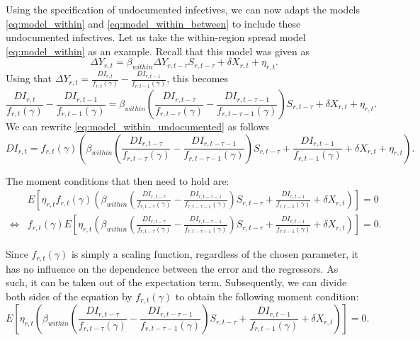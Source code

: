 \documentclass[12pt]{article}
\begin{document}
	Using the specification of undocumented infectives, we can now adapt the models \eqref{eq:model_within} and \eqref{eq:model_within_between}  to include these undocumented infectives. Let us take the within-region spread model \eqref{eq:model_within} as an example. Recall that this model was given as
	    \begin{equation*}
		    \Delta Y_{r,t} = \beta_{within}\Delta Y_{r,t-\tau}S_{r,t-\tau} + \delta X_{r,t} + \eta_{r,t}.
	    \end{equation*}
	Using that $\Delta Y_{r,t} = \frac{DI_{r,t}}{f_{r,t}(\gamma)} - \frac{DI_{r,t-1}}{f_{r,t-1}(\gamma)}$, this becomes
	    \begin{equation} \label{eq:model_within_undocumented}
		    \frac{DI_{r,t}}{f_{r,t}(\gamma)} - \frac{DI_{r,t-1}}{f_{r,t-1}(\gamma)} = \beta_{within}\left(\frac{DI_{r,t-\tau}}{f_{r,t-\tau}(\gamma)} - \frac{DI_{r,t-\tau-1}}{f_{r,t-\tau-1}(\gamma)}\right)S_{r,t-\tau} + \delta X_{r,t} + \eta_{r,t}.
	    \end{equation}
	We can rewrite \eqref{eq:model_within_undocumented} as follows
	    \begin{equation*}
	       DI_{r,t} = f_{r,t}(\gamma)\left(\beta_{within}\left(\frac{DI_{r,t-\tau}}{f_{r,t-\tau}(\gamma)} - \frac{DI_{r,t-\tau-1}}{f_{r,t-\tau-1}(\gamma)}\right)S_{r,t-\tau} + \frac{DI_{r,t-1}}{f_{r,t-1}(\gamma)} + \delta X_{r,t} + \eta_{r,t}\right).
	    \end{equation*}
	    
	The moment conditions that then need to hold are:
	    \begin{align*}
	        & E\left[ \eta_{r,t}f_{r,t}(\gamma) \left( \beta_{within}\left(\frac{DI_{r,t-\tau}}{f_{r,t-\tau}(\gamma)} - \frac{DI_{r,t-\tau-1}}{f_{r,t-\tau-1}(\gamma)}\right)S_{r,t-\tau} + \frac{DI_{r,t-1}}{f_{r,t-1}(\gamma)} + \delta X_{r,t} \right) \right] = 0 \\
	        \iff & f_{r,t}(\gamma) E\left[ \eta_{r,t}\left( \beta_{within}\left(\frac{DI_{r,t-\tau}}{f_{r,t-\tau}(\gamma)} - \frac{DI_{r,t-\tau-1}}{f_{r,t-\tau-1}(\gamma)}\right)S_{r,t-\tau} + \frac{DI_{r,t-1}}{f_{r,t-1}(\gamma)} + \delta X_{r,t} \right) \right] = 0.
	    \end{align*}
	
	Since $f_{r,t}(\gamma)$ is simply a scaling function, regardless of the chosen parameter, it has no influence on the dependence between the error and the regressors. As such, it can be taken out of the expectation term. Subsequently, we can divide both sides of the equation by $f_{r,t}(\gamma)$ to obtain the following moment condition:
	    \begin{equation} \label{eq:model_within_undocumented_moments}
	        E\left[ \eta_{r,t}\left( \beta_{within}\left(\frac{DI_{r,t-\tau}}{f_{r,t-\tau}(\gamma)} - \frac{DI_{r,t-\tau-1}}{f_{r,t-\tau-1}(\gamma)}\right)S_{r,t-\tau} + \frac{DI_{r,t-1}}{f_{r,t-1}(\gamma)} + \delta X_{r,t} \right) \right] = 0.
	    \end{equation}
	
\end{document}

